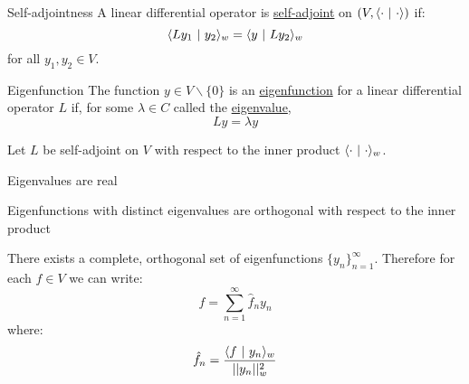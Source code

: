 \documentclass[../Main.tex]{subfiles}
\begin{document}
\begin{definition}{Self-adjointness}
    A linear differential operator is \underline{self-adjoint} on $(V, \langle \cdot~\vert~\cdot\rangle)$ if:
    \begin{equation*}
        \langle Ly_1~\vert~y_2\rangle_w = \langle y~\vert~Ly_2\rangle_w
    \end{equation*}
    for all $y_1, y_2 \in V$.
\end{definition}
\begin{definition}{Eigenfunction}
    The function $y \in V \backslash \{0\}$ is an \underline{eigenfunction} for a linear differential operator $L$ if, for some $\lambda \in C$ called the \underline{eigenvalue},
    \begin{equation}
        Ly = \lambda y
        \label{eqnEigenFunc}
    \end{equation}
\end{definition}
\begin{propositions}{
        Let $L$ be self-adjoint on $V$ with respect to the inner product $\langle \cdot~\vert~\cdot\rangle_w$.
        \label{propsSelfAdjProps}
    }
    \item Eigenvalues are real \label{propEValReal}
    \item Eigenfunctions with distinct eigenvalues are orthogonal with respect to the inner product \label{propEfuncOrtho}
    \item There exists a complete, orthogonal set of eigenfunctions $\{y_n\}_{n=1}^\infty$. Therefore for each $f \in V$ we can write:
        \begin{equation*}
            f = \sum_{n = 1}^\infty \hat{f}_n y_n
        \end{equation*}
        where: 
        \begin{equation*} 
            \hat{f}_n = \frac{\langle f~\vert~y_n\rangle_w}{||y_n||_w^2}
        \end{equation*}
        \label{propBasisEFunctions}
\end{propositions}
\end{document}
